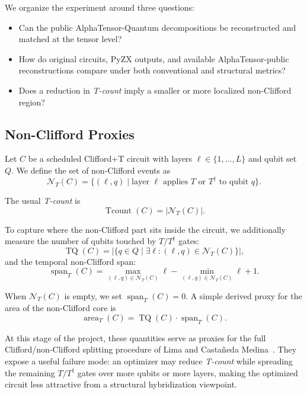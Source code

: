 \documentclass[conference]{IEEEtran}
\newcommand{\atq}{AlphaTensor-Quantum}
\newcommand{\alphapublic}{AlphaTensor-public}
\newcommand{\tcount}{\textit{T-count}}
\newcommand{\tdag}{T^{\dagger}}
\begin{document}
We organize the experiment around three questions:

\begin{itemize}
    \item Can the public \atq{} decompositions be reconstructed and matched at the tensor level?
    \item How do original circuits, PyZX outputs, and available \alphapublic{} reconstructions compare under both conventional and structural metrics?
    \item Does a reduction in \tcount{} imply a smaller or more localized non-Clifford region?
\end{itemize}


\subsection{Non-Clifford Proxies}

Let $C$ be a scheduled Clifford+T circuit with layers $\ell \in \{1,\dots,L\}$ and qubit set $Q$. We define the set of non-Clifford events as
\begin{equation}
\mathcal{N}_T(C)
=
\{(\ell,q) \mid \text{layer } \ell \text{ applies } T \text{ or } \tdag \text{ to qubit } q \}.
\end{equation}

The usual \tcount{} is
\begin{equation}
\operatorname{Tcount}(C)=|\mathcal{N}_T(C)|.
\end{equation}

To capture where the non-Clifford part sits inside the circuit, we additionally measure the number of qubits touched by $T/\tdag$ gates:
\begin{equation}
\operatorname{TQ}(C)
=
\left|\{q \in Q \mid \exists \ell : (\ell,q)\in \mathcal{N}_T(C)\}\right|,
\end{equation}
and the temporal non-Clifford span:
\begin{equation}
\operatorname{span}_T(C)
=
\max_{(\ell,q)\in\mathcal{N}_T(C)} \ell
-
\min_{(\ell,q)\in\mathcal{N}_T(C)} \ell
+
1.
\end{equation}

When $\mathcal{N}_T(C)$ is empty, we set $\operatorname{span}_T(C)=0$. A simple derived proxy for the area of the non-Clifford core is
\begin{equation}
\operatorname{area}_T(C)=\operatorname{TQ}(C)\cdot \operatorname{span}_T(C).
\end{equation}

At this stage of the project, these quantities serve as proxies for the full Clifford/non-Clifford splitting procedure of Lima and Castañeda Medina~\cite{limaCliffordNonCliffordSplitting2025}. They expose a useful failure mode: an optimizer may reduce \tcount{} while spreading the remaining $T/\tdag$ gates over more qubits or more layers, making the optimized circuit less attractive from a structural hybridization viewpoint.
\end{document}
